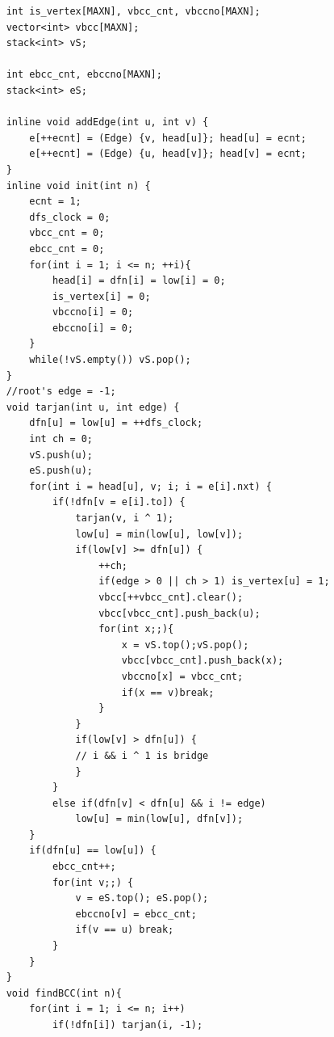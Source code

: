 \documentclass[10pt]{ctexart}
\begin{document}
{\begin{lstlisting}
    int is_vertex[MAXN], vbcc_cnt, vbccno[MAXN];              
    vector<int> vbcc[MAXN];                                   
    stack<int> vS;                                            

    int ebcc_cnt, ebccno[MAXN];                               
    stack<int> eS;                                            

    inline void addEdge(int u, int v) {
        e[++ecnt] = (Edge) {v, head[u]}; head[u] = ecnt;
        e[++ecnt] = (Edge) {u, head[v]}; head[v] = ecnt;
    }
    inline void init(int n) {
        ecnt = 1;
        dfs_clock = 0;
        vbcc_cnt = 0;                                         
        ebcc_cnt = 0;                                         
        for(int i = 1; i <= n; ++i){
            head[i] = dfn[i] = low[i] = 0;
            is_vertex[i] = 0;                                 
            vbccno[i] = 0;                                    
            ebccno[i] = 0;                                    
        }
        while(!vS.empty()) vS.pop();                          
    }
    //root's edge = -1;
    void tarjan(int u, int edge) {
        dfn[u] = low[u] = ++dfs_clock;
        int ch = 0;                                           
        vS.push(u);                                           
        eS.push(u);                                           
        for(int i = head[u], v; i; i = e[i].nxt) {
            if(!dfn[v = e[i].to]) {
                tarjan(v, i ^ 1);
                low[u] = min(low[u], low[v]);
                if(low[v] >= dfn[u]) {                        
                    ++ch;                                     
                    if(edge > 0 || ch > 1) is_vertex[u] = 1;  
                    vbcc[++vbcc_cnt].clear();                 
                    vbcc[vbcc_cnt].push_back(u);              
                    for(int x;;){                             
                        x = vS.top();vS.pop();                
                        vbcc[vbcc_cnt].push_back(x);          
                        vbccno[x] = vbcc_cnt;                 
                        if(x == v)break;                      
                    }                                         
                }                                             
                if(low[v] > dfn[u]) {                          
                // i && i ^ 1 is bridge                               
                }                                             
            }
            else if(dfn[v] < dfn[u] && i != edge) 
                low[u] = min(low[u], dfn[v]);
        }
        if(dfn[u] == low[u]) {                                 
            ebcc_cnt++;                                       
            for(int v;;) {                                     
                v = eS.top(); eS.pop();                       
                ebccno[v] = ebcc_cnt;                         
                if(v == u) break;                             
            }                                                 
        }                                                     
    }
    void findBCC(int n){
        for(int i = 1; i <= n; i++)
            if(!dfn[i]) tarjan(i, -1);


\end{lstlisting}}
\end{document}
